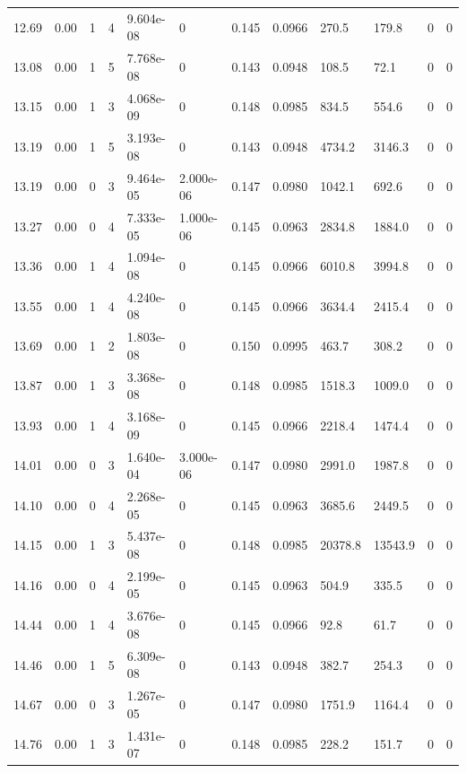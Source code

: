 \documentclass[preview]{standalone}
\begin{document}
{{{{{\begin{tabular}{L{1.2cm}C{1.2cm} C{0.3cm}C{0.5cm} C{1.4cm}C{1.4cm} C{1.4cm}C{1.4cm} C{1.6cm}C{1.6cm} C{1.6cm}C{1.6cm}}
  12.69  &  0.00  & 1     &  4 &  9.604e-08  & 0  &  0.145&   0.0966& 270.5 & 179.8   &  0 & 0  \\ 
  13.08  &  0.00  & 1     &  5 &  7.768e-08  & 0  &  0.143&   0.0948& 108.5 & 72.1   &  0 & 0  \\ 
  13.15  &  0.00  & 1     &  3 &  4.068e-09  & 0  &  0.148&   0.0985& 834.5 & 554.6   &  0 & 0  \\ 
  13.19  &  0.00  & 1     &  5 &  3.193e-08  & 0  &  0.143&   0.0948& 4734.2 & 3146.3   &  0 & 0  \\ 
  13.19  &  0.00  & 0     &  3 &  9.464e-05  & 2.000e-06  &  0.147&   0.0980& 1042.1 & 692.6   &  0 & 0  \\ 
  13.27  &  0.00  & 0     &  4 &  7.333e-05  & 1.000e-06  &  0.145&   0.0963& 2834.8 & 1884.0   &  0 & 0  \\ 
  13.36  &  0.00  & 1     &  4 &  1.094e-08  & 0  &  0.145&   0.0966& 6010.8 & 3994.8   &  0 & 0  \\ 
  13.55  &  0.00  & 1     &  4 &  4.240e-08  & 0  &  0.145&   0.0966& 3634.4 & 2415.4   &  0 & 0  \\ 
  13.69  &  0.00  & 1     &  2 &  1.803e-08  & 0  &  0.150&   0.0995& 463.7 & 308.2   &  0 & 0  \\ 
  13.87  &  0.00  & 1     &  3 &  3.368e-08  & 0  &  0.148&   0.0985& 1518.3 & 1009.0   &  0 & 0  \\ 
  13.93  &  0.00  & 1     &  4 &  3.168e-09  & 0  &  0.145&   0.0966& 2218.4 & 1474.4   &  0 & 0  \\ 
  14.01  &  0.00  & 0     &  3 &  1.640e-04  & 3.000e-06  &  0.147&   0.0980& 2991.0 & 1987.8   &  0 & 0  \\ 
  14.10  &  0.00  & 0     &  4 &  2.268e-05  & 0  &  0.145&   0.0963& 3685.6 & 2449.5   &  0 & 0  \\ 
  14.15  &  0.00  & 1     &  3 &  5.437e-08  & 0  &  0.148&   0.0985& 20378.8 & 13543.9   &  0 & 0  \\ 
  14.16  &  0.00  & 0     &  4 &  2.199e-05  & 0  &  0.145&   0.0963& 504.9 & 335.5   &  0 & 0  \\ 
  14.44  &  0.00  & 1     &  4 &  3.676e-08  & 0  &  0.145&   0.0966& 92.8 & 61.7   &  0 & 0  \\ 
  14.46  &  0.00  & 1     &  5 &  6.309e-08  & 0  &  0.143&   0.0948& 382.7 & 254.3   &  0 & 0  \\ 
  14.67  &  0.00  & 0     &  3 &  1.267e-05  & 0  &  0.147&   0.0980& 1751.9 & 1164.4   &  0 & 0  \\ 
  14.76  &  0.00  & 1     &  3 &  1.431e-07  & 0  &  0.148&   0.0985& 228.2 & 151.7   &  0 & 0  \\ 

\end{tabular}}}}}}
\end{document}
